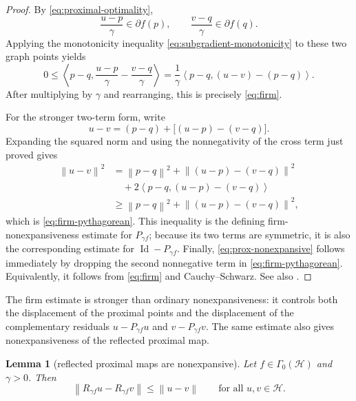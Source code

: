 \documentclass[10pt,leqno]{amsart}
\numberwithin{equation}{section}
\numberwithin{algorithm}{section}
\newtheorem{lemma}[theorem]{Lemma}
\theoremstyle{remark}
\newcommand{\Hcal}{\mathcal{H}}
\newcommand{\Id}{\operatorname{Id}}
\newcommand{\subd}{\partial}
\newcommand{\norm}[1]{\left\lVert #1 \right\rVert}
\newcommand{\ip}[2]{\left\langle #1,#2 \right\rangle}
\begin{document}
\begin{proof}
By \eqref{eq:proximal-optimality},
\[
  \frac{u-p}{\gamma}\in\subd f(p),
  \qquad
  \frac{v-q}{\gamma}\in\subd f(q).
\]
Applying the monotonicity inequality \eqref{eq:subgradient-monotonicity} to these two graph points yields
\[
  0\le
  \ip{p-q}{\frac{u-p}{\gamma}-\frac{v-q}{\gamma}}
  =\frac{1}{\gamma}
  \ip{p-q}{(u-v)-(p-q)}.
\]
After multiplying by $\gamma$ and rearranging, this is precisely \eqref{eq:firm}.

For the stronger two-term form, write
\[
  u-v=(p-q)+\bigl[(u-p)-(v-q)\bigr].
\]
Expanding the squared norm and using the nonnegativity of the cross term just proved gives
\begin{align*}
  \norm{u-v}^2
  &=\norm{p-q}^2
    +\norm{(u-p)-(v-q)}^2\\
  &\quad
    +2\ip{p-q}{(u-p)-(v-q)}\\
  &\ge
    \norm{p-q}^2
    +\norm{(u-p)-(v-q)}^2,
\end{align*}
which is \eqref{eq:firm-pythagorean}.  This inequality is the defining firm-nonexpansiveness estimate for $P_{\gamma f}$; because its two terms are symmetric, it is also the corresponding estimate for $\Id-P_{\gamma f}$.  Finally, \eqref{eq:prox-nonexpansive} follows immediately by dropping the second nonnegative term in \eqref{eq:firm-pythagorean}.  Equivalently, it follows from \eqref{eq:firm} and Cauchy--Schwarz.  See also \cite[Prop.~4.4, Prop.~23.8, and Cor.~23.11]{BauschkeCombettes2017}.
\end{proof}

The firm estimate is stronger than ordinary nonexpansiveness: it controls both the displacement of the proximal points and the displacement of the complementary residuals $u-P_{\gamma f}u$ and $v-P_{\gamma f}v$.  The same estimate also gives nonexpansiveness of the reflected proximal map.

\begin{lemma}[reflected proximal maps are nonexpansive]
\label{lem:reflected-nonexpansive}
Let $f\in\Gamma_0(\Hcal)$ and $\gamma>0$.  Then
\begin{equation}
\label{eq:reflected-nonexpansive}
  \norm{R_{\gamma f}u-R_{\gamma f}v}\le\norm{u-v}
  \qquad\text{for all }u,v\in\Hcal.
\end{equation}
\end{lemma}
\end{document}
